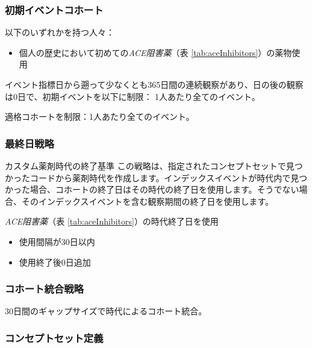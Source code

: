 \documentclass[
  11pt]{book}
\providecommand{\tightlist}{%
  \setlength{\itemsep}{0pt}\setlength{\parskip}{0pt}}
\theoremstyle{definition}
\theoremstyle{definition}
\theoremstyle{definition}
\theoremstyle{definition}
\theoremstyle{remark}
\begin{document}
\subsubsection*{初期イベントコホート}\label{ux521dux671fux30a4ux30d9ux30f3ux30c8ux30b3ux30dbux30fcux30c8}

以下のいずれかを持つ人々：

\begin{itemize}
\tightlist
\item
  個人の歴史において初めての\emph{ACE阻害薬}（表 \ref{tab:aceInhibitors}）の薬物使用
\end{itemize}

イベント指標日から遡って少なくとも365日間の連続観察があり、日の後の観察は0日で、初期イベントを以下に制限： 1人あたり全てのイベント。

適格コホートを制限：1人あたり全てのイベント。

\subsubsection*{最終日戦略}\label{ux6700ux7d42ux65e5ux6226ux7565}

カスタム薬剤時代の終了基準
この戦略は、指定されたコンセプトセットで見つかったコードから薬剤時代を作成します。インデックスイベントが時代内で見つかった場合、コホートの終了日はその時代の終了日を使用します。そうでない場合、そのインデックスイベントを含む観察期間の終了日を使用します。

\emph{ACE阻害薬}（表 \ref{tab:aceInhibitors}）の時代終了日を使用

\begin{itemize}
\tightlist
\item
  使用間隔が30日以内
\item
  使用終了後0日追加
\end{itemize}

\subsubsection*{コホート統合戦略}\label{ux30b3ux30dbux30fcux30c8ux7d71ux5408ux6226ux7565}

30日間のギャップサイズで時代によるコホート統合。

\subsubsection*{コンセプトセット定義}\label{ux30b3ux30f3ux30bbux30d7ux30c8ux30bbux30c3ux30c8ux5b9aux7fa9}
\end{document}
